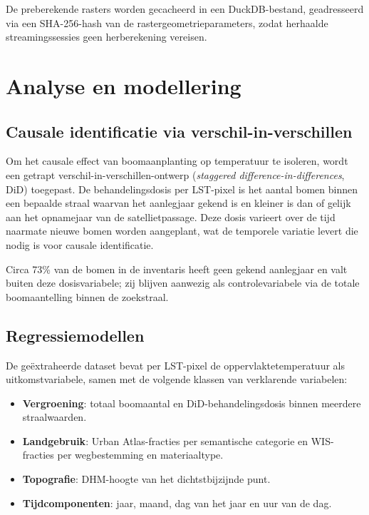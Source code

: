De preberekende rasters worden gecacheerd in een DuckDB-bestand, geadresseerd via een SHA-256-hash van de rastergeometrieparameters, zodat herhaalde streamingssessies geen herberekening vereisen.

\section{Analyse en modellering}
\label{sec:analyse}

\subsection{Causale identificatie via verschil-in-verschillen}

Om het causale effect van boomaanplanting op temperatuur te isoleren, wordt een getrapt verschil-in-verschillen-ontwerp (\textit{staggered difference-in-differences}, DiD) toegepast.
De behandelingsdosis per LST-pixel is het aantal bomen binnen een bepaalde straal waarvan het aanlegjaar gekend is en kleiner is dan of gelijk aan het opnamejaar van de satellietpassage.
Deze dosis varieert over de tijd naarmate nieuwe bomen worden aangeplant, wat de temporele variatie levert die nodig is voor causale identificatie.

Circa 73\% van de bomen in de inventaris heeft geen gekend aanlegjaar en valt buiten deze dosisvariabele; zij blijven aanwezig als controlevariabele via de totale boomaantelling binnen de zoekstraal.

\subsection{Regressiemodellen}

De geëxtraheerde dataset bevat per LST-pixel de oppervlaktetemperatuur als uitkomstvariabele, samen met de volgende klassen van verklarende variabelen:

\begin{itemize}
  \item \textbf{Vergroening}: totaal boomaantal en DiD-behandelingsdosis binnen meerdere straalwaarden.
  \item \textbf{Landgebruik}: Urban Atlas-fracties per semantische categorie en WIS-fracties per wegbestemming en materiaaltype.
  \item \textbf{Topografie}: DHM-hoogte van het dichtstbijzijnde punt.
  \item \textbf{Tijdcomponenten}: jaar, maand, dag van het jaar en uur van de dag.
\end{itemize}

